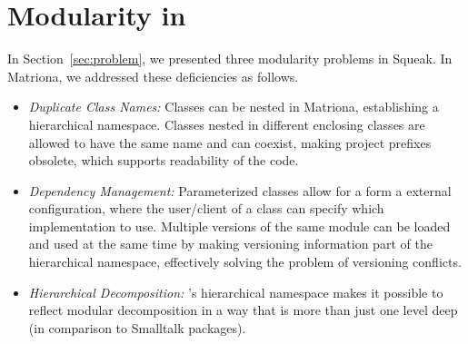 \section{Modularity in \msname}
In Section~\ref{sec:problem}, we presented three modularity problems in Squeak. In Matriona, we addressed these deficiencies as follows.

\begin{itemize}
	\item \emph{Duplicate Class Names:} Classes can be nested in Matriona, establishing a hierarchical namespace. Classes nested in different enclosing classes are allowed to have the same name and can coexist, making project prefixes obsolete, which supports readability of the code.
	\item \emph{Dependency Management:} Parameterized classes allow for a form a external configuration, where the user/client of a class can specify which implementation to use. Multiple versions of the same module can be loaded and used at the same time by making versioning information part of the hierarchical namespace, effectively solving the problem of versioning conflicts.
	\item \emph{Hierarchical Decomposition:} \msname's hierarchical namespace makes it possible to reflect modular decomposition in a way that is more than just one level deep (in comparison to Smalltalk packages).
\end{itemize}

